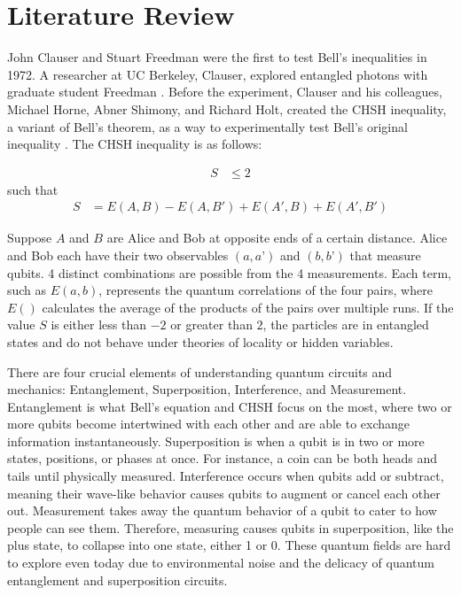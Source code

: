 \documentclass{article}
\begin{document}
\section{Literature Review}

John Clauser and Stuart Freedman were the first to test Bell’s inequalities in 1972. A researcher at UC Berkeley, Clauser, explored entangled photons with graduate student Freedman \cite{PhysRevLett.28.938}. Before the experiment, Clauser and his colleagues, Michael Horne, Abner Shimony, and Richard Holt, created the CHSH inequality, a variant of Bell’s theorem, as a way to experimentally test Bell’s original inequality \cite{PhysRevLett.23.880}. The CHSH inequality is as follows:

\begin{equation} \label{eq1}
\begin{split}
    S & \leq 2
\end{split}
\end{equation}
such that 
\begin{equation} \label{eq2}
\begin{split}
    S & = E(A,B) - E(A, B') +E(A', B) + E(A', B')
\end{split}
\end{equation}

Suppose $A$ and $B$ are Alice and Bob at opposite ends of a certain distance. Alice and Bob each have their two observables $(a, a’)$ and $(b, b’)$ that measure qubits. 4 distinct combinations are possible from the 4 measurements. Each term, such as $E(a,b)$, represents the quantum correlations of the four pairs, where $E()$ calculates the average of the products of the pairs over multiple runs. If the value $S$ is either less than $-2$ or greater than $2$, the particles are in entangled states and do not behave under theories of locality or hidden variables. 

There are four crucial elements of understanding quantum circuits and mechanics: Entanglement, Superposition, Interference, and Measurement. Entanglement is what Bell's equation and CHSH focus on the most, where two or more qubits become intertwined with each other and are able to exchange information instantaneously. Superposition is when a qubit is in two or more states, positions, or phases at once. For instance, a coin can be both heads and tails until physically measured. Interference occurs when qubits add or subtract, meaning their wave-like behavior causes qubits to augment or cancel each other out. Measurement takes away the quantum behavior of a qubit to cater to how people can see them. Therefore, measuring causes qubits in superposition, like the plus state, to collapse into one state, either 1 or 0. These quantum fields are hard to explore even today due to environmental noise and the delicacy of quantum entanglement and superposition circuits. 
\end{document}
